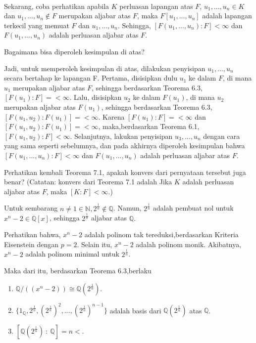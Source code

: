 \\
\par 	Sekarang, coba perhatikan apabila $K$ perluasan lapangan atas $F$, $u_1,...,u_n \in K$ dan $u_1,...,u_n \notin F$ merupakan aljabar atas $F$, maka $F[u_1,...,u_n]$ adalah lapangan terkecil yang memuat $F$ dan $u_1,...,u_n.$ Sehingga, $[F(u_1,...,u_n):F]<\infty$ 			dan  $F(u_1,...,u_n)$ adalah perluasan aljabar atas $F$.
\\
\par 	Bagaimana bisa diperoleh kesimpulan di atas?
\\
\par 	Jadi, untuk memperoleh kesimpulan di atas, dilakukan penyisipan $u_1,...,u_n$ secara bertahap ke lapangan F. Pertama, disisipkan dulu $u_1$ ke dalam $F$, di mana $u_1$ merupakan aljabar atas $F$, sehingga berdasarkan Teorema 6.3, $[F(u_1):F] = <\infty$. Lalu, disisipkan $u_2$ ke dalam $F(u_1)$, di mana $u_2$ merupakan aljabar atas $F(u_1)$, sehingga berdasarkan Teorema 6.3, $[F(u_1,u_2):F(u_1)] = <\infty$. Karena $[F(u_1):F] = <\infty$ dan $[F(u_1,u_2):F(u_1)] = <\infty$, maka,berdasarkan Teorema 6.1, $[F(u_1,u_2):F]<\infty$. Selanjutnya, lakukan penyisipan $u_3,...,u_n$ dengan cara yang sama seperti sebelumnya, dan pada akhirnya diperoleh kesimpulan bahwa $[F(u_1,...,u_n):F]<\infty$ dan  $F(u_1,...,u_n)$ adalah perluasan aljabar atas $F$.
\\
\par 	Perhatikan kembali Teorema 7.1, apakah konvers dari pernyataan tersebut juga benar? (Catatan: konvers dari Teorema 7.1 adalah Jika $K$ adalah perluasan aljabar atas $F$, maka $[K:F] < \infty$.)
\\
\par 	Untuk sembarang $n\ne1 \in \mathbb{N}, 2^{\frac{1}{n}} \notin \mathbb{Q}$. Namun, $2^{\frac{1}{n}}$ adalah pembuat nol untuk $x^n-2 \in \mathbb{Q}[x]$, sehingga $2^{\frac{1}{n}}$ aljabar atas $\mathbb{Q}.$
\\
\par 	Perhatikan bahwa, $x^n-2$ adalah polinom tak tereduksi,berdasarkan Kriteria Eisenstein dengan $p=2$. Selain itu,  $x^n-2$ adalah polinom monik. Akibatnya,  $x^n-2$ adalah polinom minimal untuk $2^{\frac{1}{n}}$. 
\\
\par 	Maka dari itu, berdasarkan Teorema 6.3,berlaku
	\begin{enumerate}
	\item $\mathbb{Q}/((x^n-2)) \cong \mathbb{Q}(2^{\frac{1}{n}}).$ 
	\item $\{1_{\mathbb{Q}},2^{\frac{1}{n}},(2^{\frac{1}{n}})^2,...,(2^{\frac{1}{n}})^{n-1}\}$ adalah basis dari  $\mathbb{Q}(2^{\frac{1}{n}})$ atas $\mathbb{Q}$.
	\item $[ \mathbb{Q}(2^{\frac{1}{n}})~:~\mathbb{Q}]=n<.$
	\end{enumerate}

